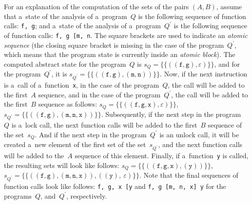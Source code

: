 \begin{example}
    For an explanation of the computation of the sets of the pairs ${ (A,
    B) }$, assume that a~state of the analysis of a~program~$ Q $ is the
    following sequence of function calls: \texttt{f,~g}; and a~state of the
    analysis of a~program~$ Q^\prime $ is the following sequence of function
    calls: \texttt{f,~g~[m,~n}. The square brackets are used to indicate an
    \emph{atomic sequence} (the closing square bracket is missing in the case
    of the program~$ Q^\prime $, which means that the program state is
    currently inside an \emph{atomic block}). The computed abstract state for
    the program~$ Q $ is $ s_Q = {\{\{((\mathtt{f, g}), \varepsilon)\}\}} $,
    and for the program~$ Q^\prime $,
    it is $ s_{Q^\prime} = {\{\{((\mathtt{f, g}), (\mathtt{m, n}))\}\}} $. Now,
    if the next instruction is a~call of a~function~\texttt{x}, in the case of
    the program~$ Q $, the call will be added to the first~$ A $ sequence, and
    in the case of the program~$ Q^\prime $, the call will be added to the
    first~$ B $ sequence as follows: $ s_Q = {\{\{((\mathtt{f, g, x}),
    \varepsilon)\}\}} $, $ s_{Q^\prime} = {\{\{((\mathtt{f, g}), (\mathtt{m, n,
    x}))\}\}} $. Subsequently, if the next step in the program~$ Q $ is a~lock
    call, the next function calls will be added to the first~$ B $ sequence
    of the set~$ s_Q $. And if the next step in the program~$ Q^\prime $ is an
    unlock call, it will be created a~new element of the first set of the
    set~$ s_{Q^\prime} $, and the next function calls will be added to
    the~$ A $ sequence of this element. Finally, if a~function~\texttt{y} is
    called, the resulting sets will look like follows: $ s_Q =
    {\{\{((\mathtt{f, g, x}), (\mathtt{y}))\}\}} $, $ s_{Q^\prime} =
    {\{\{((\mathtt{f, g}), (\mathtt{m, n, x})), ((\mathtt{y}),\
    \varepsilon)\}\}} $. Note that the final sequences of function calls
    look like follows: \texttt{f,~g,~x~[y} and \texttt{f,~g~[m,~n,~x]~y} for
    the programs~$ Q $, and~$ Q^\prime $, respectively.
\end{example}

